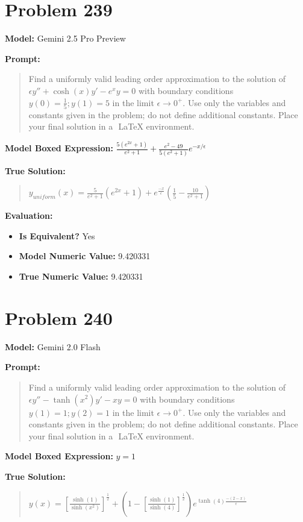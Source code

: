 \documentclass{article}
\begin{document}
{\section*{Problem 239}
\textbf{Model:} Gemini 2.5 Pro Preview

\textbf{Prompt:}
\begin{quote}
Find a uniformly valid leading order approximation to the solution of $\epsilon y'' + \cosh(x)y' - e^xy = 0$ with boundary conditions $y(0) = \frac{1}{5}; y(1) = 5$ in the limit $\epsilon \to 0^+$. Use only the variables and constants given in the problem; do not define additional constants. Place your final solution in a $\boxed{}$ LaTeX environment.
\end{quote}
\textbf{Model Boxed Expression:} $\frac{5(e^{2x}+1)}{e^2+1} + \frac{e^2-49}{5(e^2+1)}e^{-x/\epsilon}$

\textbf{True Solution:}
\begin{quote}
$y_{uniform}(x) = \frac{5}{e^2+1}(e^{2x} + 1) + e^{\frac{-x}{\epsilon}}(\frac{1}{5}-\frac{10}{e^2+1})$
\end{quote}

\textbf{Evaluation:}
\begin{itemize}
\item \textbf{Is Equivalent?} Yes
\item \textbf{Model Numeric Value:} 9.420331
\item \textbf{True Numeric Value:} 9.420331
\end{itemize}
\vspace{1cm}
\section*{Problem 240}
\textbf{Model:} Gemini 2.0 Flash

\textbf{Prompt:}
\begin{quote}
Find a uniformly valid leading order approximation to the solution of $\epsilon y'' - \tanh(x^2)y' - xy = 0$ with boundary conditions $y(1) = 1; y(2) = 1$ in the limit $\epsilon \to 0^+$. Use only the variables and constants given in the problem; do not define additional constants. Place your final solution in a $\boxed{}$ LaTeX environment.
\end{quote}
\textbf{Model Boxed Expression:} $y = 1$

\textbf{True Solution:}
\begin{quote}
$y(x) = [\frac{\sinh(1)}{\sinh(x^2)}]^\frac{1}{2} + (1-[\frac{\sinh(1)}{\sinh(4)}]^\frac{1}{2})e^{\tanh(4)\frac{-(2-x)}{\epsilon}}$
\end{quote}

}
\end{document}
